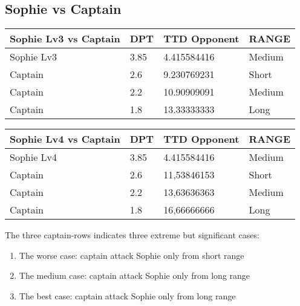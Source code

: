 \subsection{Sophie vs Captain}
\begin{table}[H]
  \centering
\begin{tabular}{|l|l|l|l|}
\hline
\rowcolor[HTML]{C0C0C0} 
\textbf{Sophie Lv3 vs Captain} & \textbf{DPT} & \textbf{TTD Opponent} & \textbf{RANGE} \\ \hline
Sophie Lv3 & 3.85 & 4.415584416 & Medium \\ \hline
Captain & 2.6 & 9.230769231 & Short \\ \hline
Captain & 2.2 & 10.90909091 & Medium \\ \hline
Captain & 1.8 & 13.33333333 & Long \\ \hline
\end{tabular}
\end{table}
\begin{table}[H]
  \centering
\begin{tabular}{|l|l|l|l|}
\hline
\rowcolor[HTML]{C0C0C0} 
\textbf{Sophie Lv4 vs Captain} & \textbf{DPT} & \textbf{TTD Opponent} & \textbf{RANGE} \\ \hline
Sophie Lv4 & 3.85 & 4.415584416 & Medium \\ \hline
Captain & 2.6 & 11,53846153 & Short \\ \hline
Captain & 2.2 & 13,63636363 & Medium \\ \hline
Captain & 1.8 & 16,66666666 & Long \\ \hline
\end{tabular}
\end{table}
The three captain-rows indicates three extreme but significant cases:
\begin{enumerate}
\item The worse case: captain attack Sophie only from short range
\item The medium case: captain attack Sophie only  from long range
\item The best case: captain attack Sophie only  from long range
\end{enumerate}
